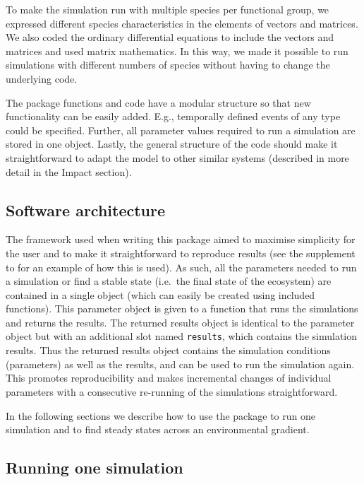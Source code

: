\documentclass[preprint,12pt, a4paper]{elsarticle}
\begin{document}
To make the simulation run with multiple species per functional group,
we expressed different species characteristics in the elements of
vectors and matrices. We also coded the ordinary differential equations
to include the vectors and matrices and used matrix mathematics. In this
way, we made it possible to run simulations with different numbers of
species without having to change the underlying code.

The package functions and code have a modular structure so that new
functionality can be easily added. E.g., temporally defined events of
any type could be specified. Further, all parameter values required to
run a simulation are stored in one object. Lastly, the general structure
of the code should make it straightforward to adapt the model to other
similar systems (described in more detail in the Impact section).

\hypertarget{software-architecture}{%
\subsection{Software architecture}\label{software-architecture}}

The framework used when writing this package aimed to maximise
simplicity for the user and to make it straightforward to reproduce
results (see the supplement \citep{Petchey2022} to \citet{Limberger2022}
for an example of how this is used). As such, all the parameters needed
to run a simulation or find a stable state (i.e.~the final state of the
ecosystem) are contained in a single object (which can easily be created
using included functions). This parameter object is given to a function
that runs the simulations and returns the results. The returned results
object is identical to the parameter object but with an additional slot
named \texttt{results}, which contains the simulation results. Thus the
returned results object contains the simulation conditions (parameters)
as well as the results, and can be used to run the simulation again.
This promotes reproducibility and makes incremental changes of
individual parameters with a consecutive re-running of the simulations
straightforward.

In the following sections we describe how to use the package to run one
simulation and to find steady states across an environmental gradient.

\hypertarget{running-one-simulation}{%
\subsection{Running one simulation}\label{running-one-simulation}}
\end{document}
